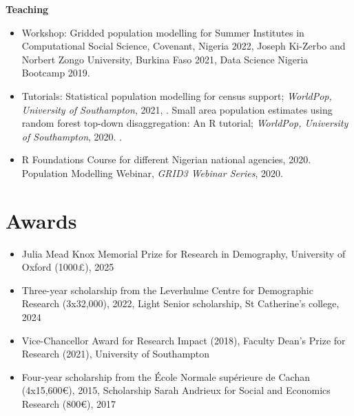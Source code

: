 \documentclass[
]{friggeri-cv}
\begin{document}
\begin{noside}
\textbf{Teaching}
\begin{itemize}
\item Workshop: Gridded population modelling for Summer Institutes in Computational Social Science, Covenant, Nigeria 2022, Joseph Ki-Zerbo and Norbert Zongo University, Burkina Faso 2021, Data Science Nigeria Bootcamp 2019. 

\item  Tutorials: Statistical population modelling for census support; \textit{WorldPop, University of Southampton}, 2021, \href{https://wpgp.github.io/bottom-up-tutorial/}{\scriptsize{}}. Small area population estimates using random forest top-down disaggregation: An R tutorial;   \textit{WorldPop, University of Southampton}, 2020. \href{https://htmlpreview.github.io/?https://github.com/wpgp/top-down-tutorial/blob/master/4_tutorial.html#Suggested_Citation}{\scriptsize{}}.

\item R Foundations Course for different Nigerian national agencies, 2020. Population Modelling Webinar, \textit{GRID3 Webinar Series}, 2020. \href{https://www.youtube.com/watch?v=HMFM8HzLfH8}{\scriptsize{}}

\end{itemize}


\section{Awards}
\begin{itemize}
\item Julia Mead Knox Memorial Prize for Research in Demography, University of Oxford (1000£), 2025
\item Three-year scholarship from the Leverhulme Centre for Demographic Research (3x32,000), 2022, Light Senior scholarship, St Catherine's college, 2024
\item Vice-Chancellor Award for Research Impact (2018), Faculty Dean's Prize for Research (2021), University of Southampton
\item Four-year scholarship from the École Normale supérieure de Cachan (4x15,600€), 2015, Scholarship Sarah Andrieux for Social and Economics Research (800€), 2017
\end{itemize}
\end{noside}
\end{document}
